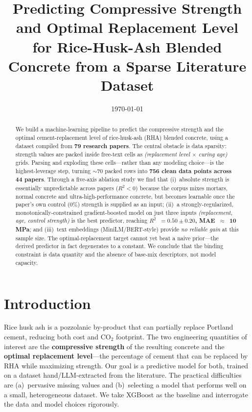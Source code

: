 \documentclass[11pt]{article}
\title{\textbf{Predicting Compressive Strength and Optimal Replacement Level\\
for Rice-Husk-Ash Blended Concrete from a Sparse Literature Dataset}}
\date{\today}
\newcommand{\R}{$R^2$}
\begin{document}
\maketitle

\begin{abstract}
\noindent
We build a machine-learning pipeline to predict the compressive strength and the
optimal cement-replacement level of rice-husk-ash (RHA) blended concrete, using a
dataset compiled from \textbf{79 research papers}. The central obstacle is data
sparsity: strength values are packed inside free-text cells as
\emph{(replacement level $\times$ curing age)} grids. Parsing and exploding these
cells---rather than any modeling choice---is the highest-leverage step, turning
$\sim$70 packed rows into \textbf{756 clean data
points across 44 papers}. Through a five-axis ablation study we find that
(i)~absolute strength is essentially unpredictable across papers ($R^2<0$) because
the corpus mixes mortars, normal concrete and ultra-high-performance concrete, but
becomes learnable once the paper's own control (0\%) strength is supplied as an
input; (ii)~a strongly-regularized, monotonically-constrained gradient-boosted
model on just three inputs \emph{(replacement, age, control strength)} is the best
predictor, reaching \textbf{\R{}~$=0.50\pm0.20$, MAE~$\approx$~10\,MPa}; and
(iii)~text embeddings (MiniLM/BERT-style) provide \emph{no reliable gain} at this
sample size. The optimal-replacement target cannot yet beat a naive prior---the
derived predictor in fact degenerates to a constant. We conclude that the binding
constraint is data quantity and the absence of base-mix descriptors, not model
capacity.
\end{abstract}

\section{Introduction}
Rice husk ash is a pozzolanic by-product that can partially replace Portland cement,
reducing both cost and $\mathrm{CO_2}$ footprint. The two engineering quantities of
interest are the \textbf{compressive strength} of the resulting concrete and the
\textbf{optimal replacement level}---the percentage of cement that can be replaced by
RHA while maximizing strength. Our goal is a predictive model for both, trained on a
dataset hand/LLM-extracted from the literature. The practical difficulties are
(a)~pervasive missing values and (b)~selecting a model that performs well on a small,
heterogeneous dataset. We take XGBoost as the baseline and interrogate the data and
model choices rigorously.
\end{document}
